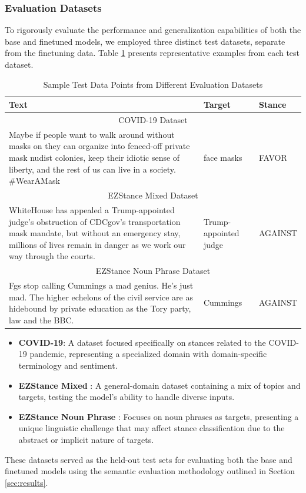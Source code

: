 \documentclass[twocolumn,11pt,letterpaper]{article}
\begin{document}
\subsubsection{Evaluation Datasets}
To rigorously evaluate the performance and generalization capabilities of both the base and finetuned models, we employed three distinct test datasets, separate from the finetuning data. Table \ref{tab:test_samples} presents representative examples from each test dataset.

\begin{table}[!htbp]
\centering
\caption{Sample Test Data Points from Different Evaluation Datasets}
\label{tab:test_samples}
\begin{tabular}{|p{}|p{}|p{}|}
\hline
\textbf{Text} & \textbf{Target} & \textbf{Stance} \\
\hline
\multicolumn{3}{|c|}{COVID-19 Dataset} \\
\hline
Maybe if people want to walk around without masks on they can organize into fenced-off private mask nudist colonies, keep their idiotic sense of liberty, and the rest of us can live in a society. \#WearAMask & face masks & FAVOR \\
\hline
\multicolumn{3}{|c|}{EZStance Mixed Dataset} \\
\hline
WhiteHouse has appealed a Trump-appointed judge's obstruction of CDCgov's transportation mask mandate, but without an emergency stay, millions of lives remain in danger as we work our way through the courts. & Trump-appointed judge & AGAINST \\
\hline
\multicolumn{3}{|c|}{EZStance Noun Phrase Dataset} \\
\hline
Fgs stop calling Cummings a mad genius. He's just mad. The higher echelons of the civil service are as hidebound by private education as the Tory party, law and the BBC. & Cummings & AGAINST \\
\hline
\end{tabular}
\end{table}

\begin{itemize}
    \item \textbf{COVID-19}: A dataset focused specifically on stances related to the COVID-19 pandemic, representing a specialized domain with domain-specific terminology and sentiment.
    \item \textbf{EZStance Mixed} \cite{akash2024}: A general-domain dataset containing a mix of topics and targets, testing the model's ability to handle diverse inputs.
    \item \textbf{EZStance Noun Phrase} \cite{akash2024}: Focuses on noun phrases as targets, presenting a unique linguistic challenge that may affect stance classification due to the abstract or implicit nature of targets.
\end{itemize}
These datasets served as the held-out test sets for evaluating both the base and finetuned models using the semantic evaluation methodology outlined in Section \ref{sec:results}.
\end{document}
